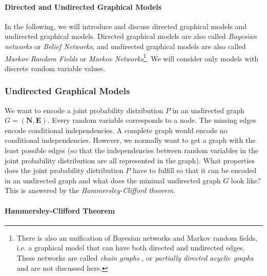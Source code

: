 \paragraph{Directed and Undirected Graphical Models}

In the following, we will introduce and discuss directed graphical
models and undirected graphical models. Directed graphical models
are also called \emph{Bayesian networks}
or \emph{Belief Networks}, and undirected graphical
models are also called \emph{Markov Random Fields}
or \emph{Markov Networks}\footnote{There is also an unification of Bayesian networks and Markov random
fields, i.e. a graphical model that can have both directed and undirected
edges. These networks are called \emph{chain graphs} , or \emph{partially
directed acyclic graphs} and are not discussed here.}. We will consider only models with discrete random variable values.

\subsubsection{Undirected Graphical Models\label{par:Hammersley-Clifford-theorem}}

We want to encode a joint probability distribution $P$ in an undirected
graph $G=(\mathbf{N},\mathbf{E})$. Every random variable corresponds
to a node. The missing edges encode conditional independencies. A
complete graph would encode no conditional independencies. However,
we normally want to get a graph with the least possible edges (so
that the independencies between random variables in the joint probability
distribution are all represented in the graph). What properties does
the joint probability distribution $P$ have to fulfill so that it
can be encoded in an undirected graph and what does the minimal undirected
graph $G$ look like? This is answered by the \emph{Hammersley-Clifford
theorem}.  \cite{HammersleyClifford1971}

\paragraph{Hammersley-Clifford Theorem\label{par:The-Hammersley-Clifford-theorem-of-Undirected-Graphical-Model}}

